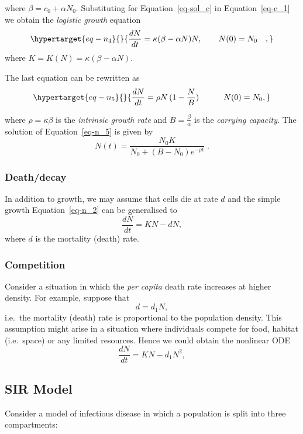 \documentclass[
  letterpaper,
  DIV=11,
  numbers=noendperiod]{scrreprt}
\theoremstyle{plain}
\theoremstyle{definition}
\theoremstyle{plain}
\theoremstyle{remark}
\begin{document}
where \(\beta=c_0 +\alpha N_0\). Substituting for
Equation~\ref{eq-sol_c} in Equation~\ref{eq-c_1} we obtain the
\emph{logistic growth} equation
\begin{equation}\protect\hypertarget{eq-n_4}{}{
\frac{dN}{dt} = \kappa ( \beta- \alpha N)  N, \qquad  N(0)= N_0\quad,
}\label{eq-n_4}\end{equation} where
\(K=K(N) = \kappa (\beta - \alpha N)\).

The last equation can be rewritten as
\begin{equation}\protect\hypertarget{eq-n_5}{}{  
\frac{dN}{dt} = \rho  N \,  (1 - \frac N B)  \qquad \quad N(0)= N_0, 
}\label{eq-n_5}\end{equation}

where \(\rho = \kappa \beta\) is the \emph{intrinsic growth rate} and
\(B = \frac \beta \alpha\) is the \emph{carrying capacity}. The solution
of Equation~\ref{eq-n_5} is given by \[
N(t)= \frac{ N_0 K} { N_0 + (B-N_0) e^{-\rho t}} \; .
\]

\hypertarget{deathdecay}{%
\subsubsection{Death/decay}\label{deathdecay}}

In addition to growth, we may assume that cells die at rate \(d\) and
the simple growth Equation~\ref{eq-n_2} can be generalised to \[
\frac{dN}{dt} = KN - d N, 
\] where \(d\) is the mortality (death) rate.

\hypertarget{competition}{%
\subsubsection{Competition}\label{competition}}

Consider a situation in which the \emph{per capita} death rate increases
at higher density. For example, suppose that \[
d=d_1 N,
\] i.e.~the mortality (death) rate is proportional to the population
density. This assumption might arise in a situation where individuals
compete for food, habitat (i.e.~space) or any limited resources. Hence
we could obtain the nonlinear ODE \[
\frac{dN}{dt} = KN - d_1 N^2 , 
\]

\hypertarget{sir-model}{%
\subsection{SIR Model}\label{sir-model}}

Consider a model of infectious disease in which a population is split
into three compartments:
\end{document}
